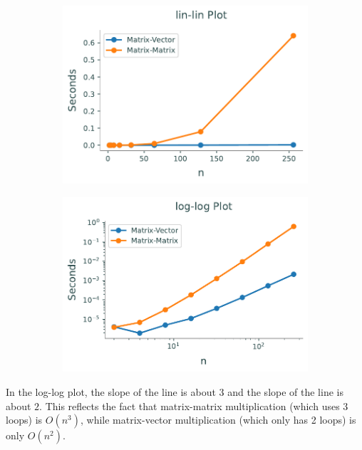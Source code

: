 \begin{figure}[H] %
\captionsetup[subfigure]{justification=centering}
\centering
\begin{subfigure}{.5\textwidth}
    \centering
    \includegraphics[width=\linewidth]{figures/loglogDemoBad.pdf}
\end{subfigure}%
\begin{subfigure}{.5\textwidth}
    \centering
    \includegraphics[width=\linewidth]{figures/loglogDemoGood.pdf}
\end{subfigure}
\caption{ }
\label{fig:loglogdemo}
\end{figure}

In the log-log plot, the slope of the  line is about $3$ and the slope of the  line is about $2$.
This reflects the fact that matrix-matrix multiplication (which uses 3 loops) is $O(n^3)$, while matrix-vector multiplication (which only has 2 loops) is only $O(n^2)$.

